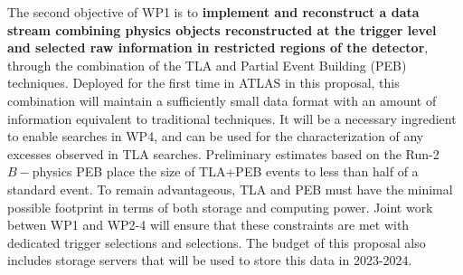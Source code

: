 The second objective of WP1 is to \textbf{implement and reconstruct a data stream combining physics objects reconstructed at the trigger level and selected raw information in restricted regions of the detector}, through the combination of the TLA and Partial Event Building (PEB) techniques. 
Deployed for the first time in ATLAS in this proposal, this combination will maintain a sufficiently small data format with an amount of information equivalent to traditional techniques. 
It will be a necessary ingredient to enable searches in WP4, and can be used for the characterization of any excesses observed in TLA searches. 
Preliminary estimates based on the Run-2 $B-$physics PEB %
place the size of TLA+PEB events to less than half of a standard event. 
To remain advantageous, TLA and PEB must have the minimal possible footprint in terms of both storage and computing power. 
Joint work betwen WP1 and WP2-4 will ensure that these constraints are met with dedicated trigger selections and selections.   
The budget of this proposal also includes storage servers that will be used to store this data in 2023-2024. 

